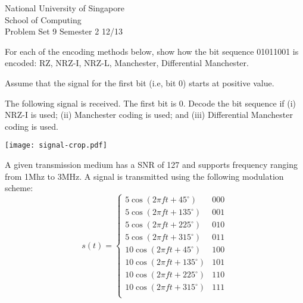 \documentclass[a4paper,11pt]{exam}
\begin{document}
    \extraheadheight{.5in}
    {\large\sf National University of Singapore\\ School of Computing \\
    \LARGE\sf Problem Set 9}%
    {\large\sf Semester 2 12/13}
    \firstpageheadrule
    \pagestyle{headandfoot}

\begin{questions}
\question 
	For each of the encoding methods below, show how the bit 
	sequence 01011001 is encoded: RZ, NRZ-I, NRZ-L, Manchester, Differential Manchester.  
	
	Assume that the signal for the first bit (i.e, bit 0) starts at positive value.

\question 
	The following signal is received.  The first bit is 0.  Decode the bit sequence if (i) NRZ-I is used; (ii) Manchester coding is used; and (iii) Differential Manchester coding is used.  

	\begin{center}
	\texttt{[image: signal-crop.pdf]}
	\end{center}

\question A given transmission medium has a SNR of 127 and supports frequency ranging from 1Mhz to 3MHz.  A signal is transmitted using the following modulation scheme:
	\[
	s(t) = \left\{\begin{array}{lr}
		5 \cos(2\pi ft + 45^\circ)  & 000\\
		5 \cos(2\pi ft + 135^\circ)  & 001\\
		5 \cos(2\pi ft + 225^\circ)  & 010\\
		5 \cos(2\pi ft + 315^\circ)  & 011\\
		10 \cos(2\pi ft + 45^\circ)  & 100\\
		10 \cos(2\pi ft + 135^\circ)  & 101\\
		10 \cos(2\pi ft + 225^\circ)  & 110\\
		10 \cos(2\pi ft + 315^\circ)  & 111\\
	\end{array}
		\right.
		\]
\question 

\end{questions}
\end{document}
